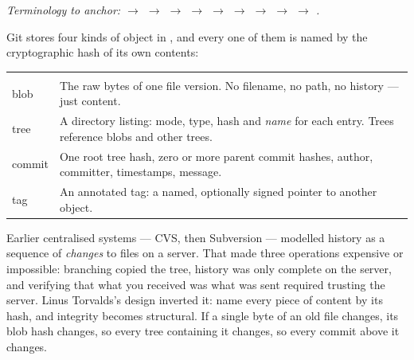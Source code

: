 \begin{center}\small\itshape\color{cInk!70}
Terminology to anchor:  $\rightarrow$  $\rightarrow$  $\rightarrow$  $\rightarrow$  $\rightarrow$  $\rightarrow$  $\rightarrow$  $\rightarrow$  $\rightarrow$ .
\end{center}



 Git stores four kinds of object in , and every one of them is named by the cryptographic hash of its own contents:

\begin{center}\small
\wbrowcolors
\begin{tabularx}{\linewidth}{@{}L{20mm} X@{}}
 & \\
blob & The raw bytes of one file version. No filename, no path, no history --- just content.\\
tree & A directory listing: mode, type, hash and \emph{name} for each entry. Trees reference blobs and other trees.\\
commit & One root tree hash, zero or more parent commit hashes, author, committer, timestamps, message.\\
tag & An annotated tag: a named, optionally signed pointer to another object.\\
\end{tabularx}
\end{center}

 Earlier centralised systems --- CVS, then Subversion --- modelled history as a sequence of \emph{changes} to files on a server. That made three operations expensive or impossible: branching copied the tree, history was only complete on the server, and verifying that what you received was what was sent required trusting the server. Linus Torvalds's design inverted it: name every piece of content by its hash, and integrity becomes structural. If a single byte of an old file changes, its blob hash changes, so every tree containing it changes, so every commit above it changes. 


